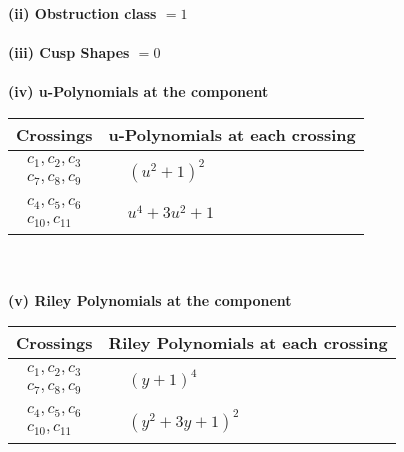 \documentclass[1p]{elsarticle_modified}
\theoremstyle{definition}
\begin{document}
\flushleft \textbf{(ii) Obstruction class $= 1$}\\~\\
\flushleft \textbf{(iii) Cusp Shapes $= 0$}\\~\\
\newpage\renewcommand{\arraystretch}{1}
\flushleft \textbf{(iv) u-Polynomials at the component}\newline \\
\begin{tabular}{m{50pt}|m{274pt}}
Crossings & \hspace{64pt}u-Polynomials at each crossing \\
\hline $$\begin{aligned}c_{1},c_{2},c_{3}\\c_{7},c_{8},c_{9}\end{aligned}$$&$\begin{aligned}
&(u^2+1)^2
\end{aligned}$\\
\hline $$\begin{aligned}c_{4},c_{5},c_{6}\\c_{10},c_{11}\end{aligned}$$&$\begin{aligned}
&u^4+3 u^2+1
\end{aligned}$\\
\hline
\end{tabular}\\~\\
\newpage\renewcommand{\arraystretch}{1}
\flushleft \textbf{(v) Riley Polynomials at the component}\newline \\
\begin{tabular}{m{50pt}|m{274pt}}
Crossings & \hspace{64pt}Riley Polynomials at each crossing \\
\hline $$\begin{aligned}c_{1},c_{2},c_{3}\\c_{7},c_{8},c_{9}\end{aligned}$$&$\begin{aligned}
&(y+1)^4
\end{aligned}$\\
\hline $$\begin{aligned}c_{4},c_{5},c_{6}\\c_{10},c_{11}\end{aligned}$$&$\begin{aligned}
&(y^2+3 y+1)^2
\end{aligned}$\\
\hline
\end{tabular}\\~\\
\end{document}
